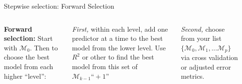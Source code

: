 \documentclass[mathserif, aspectratio=169]{beamer}
\begin{document}
\begin{frame}{Stepwise selection: Forward Selection}

\begin{columns}

\textbf{Forward selection:} Start with $\mathcal{M}_0$.  Then to choose the best model from each higher ``level'':

\vspace{5mm}
\textit{First, }within each level, add one predictor at a time to the best model from the lower level.  Use $R^2$ or other to find the best model from this set of $\mathcal{M}_{k-1} \text{``}+ 1\text{''}$

\vspace{5mm}

\textit{Second,} choose from your list $\{\mathcal{M}_0, \mathcal{M}_1,...\mathcal{M}_{p}\}$ via cross validation or adjusted error metrics.\\~\\


\vspace*{-15mm}
\begin{center}
\end{center}
\end{columns}

\end{frame}
\end{document}
